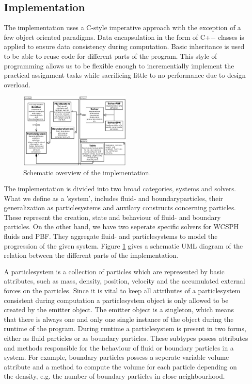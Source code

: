 \documentclass[11pt, letterpaper, twocolumn]{article}
\begin{document}


\subsection{Implementation}
The implementation uses a C-style imperative approach with the exception of a few object oriented paradigms. Data encapsulation in the form of C++ classes is applied to ensure data consistency during computation. Basic inheritance is used to be able to reuse code for different parts of the program. This style of programming allows us to be flexible enough to incrementially implement the practical assignment tasks while sacrificing little to no performance due to design overload.  
\begin{figure}[ht]
    \centering
    \includegraphics[width=0.5\textwidth]{images/system.pdf}
    \caption{Schematic overview of the implementation.}
    \label{fig:systemuml}
\end{figure}
  
The implementation is divided into two broad categories, systems and solvers.
What we define as a 'system', includes fluid- and boundaryparticles, their generalization as particlesystems and auxilary constructs concerning particles. These represent the creation, state and behaviour of fluid- and boundary particles.
On the other hand, we have two seperate specific solvers for WCSPH fluids and PBF. They aggregate fluid- and particlesystems to model the progression of the given system. Figure \ref{fig:systemuml} gives a schematic UML diagram of the relation between the different parts of the implementation.


A particlesystem is a collection of particles which are represented by basic attributes, such as mass, density, position, velocity and the accumulated external forces on the particles. Since it is vital to keep all attributes of a particlesystem consistent during computation a particlesystem object is only allowed to be created by the emitter object. The emitter object is a singleton, which means that there is always one and only one single instance of the object during the runtime of the program. During runtime a particlesystem is present in two forms, either as fluid particles or as boundary particles. These subtypes posess attributes and methods responsible for the behaviour of fluid or boundary particles in a system. For example, boundary particles possess a seperate variable volume attribute and a method to compute the volume for each particle depending on the density, e.g. the number of boundary particles in close neighbourhood.
\end{document}
